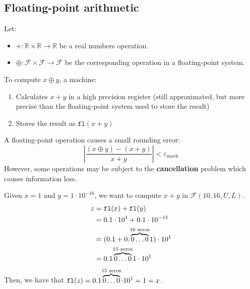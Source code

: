 \subsection{Floating-point arithmetic}
Let:
\begin{itemize}
    \item $+: \mathbb{R} \times \mathbb{R} \rightarrow \mathbb{R}$ be a real numbers operation.
    \item $\oplus: \mathcal{F} \times \mathcal{F} \rightarrow \mathcal{F}$ be the corresponding operation in a floating-point system.
\end{itemize}
%
To compute $x \oplus y$, a machine:
\begin{enumerate}
    \item Calculates $x + y$ in a high precision register 
        (still approximated, but more precise than the floating-point system used to store the result)
    \item Stores the result as $\texttt{fl}(x + y)$
\end{enumerate}

A floating-point operation causes a small rounding error:
\[
    \left\vert \frac{(x \oplus y) - (x + y)}{x+y} \right\vert < \varepsilon_{\text{mach}}
\]
%
However, some operations may be subject to the \textbf{cancellation} problem which causes information loss.
\begin{example}
    Given $x = 1$ and $y = 1 \cdot 10^{-16}$, we want to compute $x + y$ in $\mathcal{F}(10, 16, U, L)$.\\
    \begin{equation*}
        \begin{split}
            z & = \texttt{fl}(x) + \texttt{fl}(y) \\
              & = 0.1 \cdot 10^1 + 0.1 \cdot 10^{-15} \\
              & = (0.1 + 0.\overbrace{0\dots0}^{\mathclap{16\text{ zeros}}}1) \cdot 10^1 \\
              & = 0.1\overbrace{0\dots0}^{\mathclap{15\text{ zeros}}}1 \cdot 10^1
        \end{split}
    \end{equation*}
    Then, we have that $\texttt{fl}(z) = 0.1\overbrace{0\dots0}^{\mathclap{15\text{ zeros}}} \cdot 10^1 = 1 = x$.
\end{example}